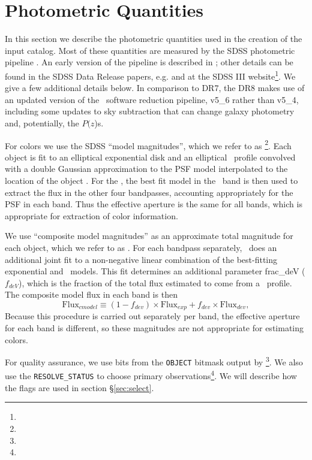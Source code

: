 \documentclass[12pt,preprint]{aastex}
\newcommand{\pofz}{$P(z$)}
\begin{document}
\section{Photometric Quantities} \label{sec:photo}

In this section we describe the photometric quantities used in the creation of the
input catalog.  Most of these quantities are measured by the SDSS photometric
pipeline \photo. An early version of the pipeline is described in
\citet{LuptonADASS01};  other details can be found in the SDSS Data Release
papers, e.g. \citet{dr4} and at the SDSS III website\footnote{\sdssweb}.  We
 give a few additional details below.  In comparison to DR7, the DR8
makes use of an updated version of the \photo\ software reduction pipeline,
v5\_6 rather than v5\_4, including some updates to sky subtraction that can
change galaxy photometry and, potentially, the \pofz s.

For colors we use the SDSS ``model magnitudes'', which we refer to as
\modelmag \footnote{\DRatemags}.  Each object is fit to an elliptical
exponential disk and an elliptical \devauc\ profile convolved with a double
Gaussian approximation to the PSF model interpolated to the location of the
object \citep{LuptonADASS01,Sheldon04}.  For the \modelmag, the best fit model
in the \rmag\ band is then used to extract the flux in the other four
bandpasses, accounting appropriately for the PSF in each band. Thus the
effective aperture is the same for all bands, which is appropriate for
extraction of color information.

We use ``composite model magnitudes'' as an approximate total magnitude for
each object, which we refer to as \cmodelmag.  For each bandpass
separately, \photo\ does an additional joint fit to a non-negative
linear combination of the  best-fitting exponential and \devauc\
models. This fit determines an additional parameter {\sc frac\_deV}
($f_{deV}$), which is the fraction of the total flux estimated to come
from a \devauc\ profile.  The composite model flux in each band is then 
\begin{equation}
\textrm{Flux}_{cmodel} \equiv (1-f_{dev})\times \textrm{Flux}_{exp} + f_{dev} \times \textrm{Flux}_{dev},
\end{equation}
Because this procedure is carried out separately per band, the effective aperture for each band is
different, so these magnitudes are not appropriate for estimating colors.

For quality assurance, we use bits from the \texttt{OBJECT} bitmask output by
\photo \footnote{\DRateflags}.    We also use the \texttt{RESOLVE\_STATUS} to
choose primary observations\footnote{\DRateresolve}.  We will describe how the
flags are used in section \S \ref{sec:select}.
\end{document}
